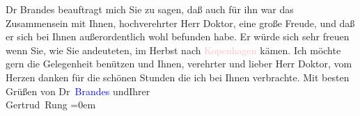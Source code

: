            \pstart
           Dr Brandes beauftragt mich Sie {\pb}zu sagen, daß auch für ihn war das Zusammensein mit Ihnen, hochverehrter Herr
                    Doktor, eine große Freude, und daß er sich bei Ihnen außerordentlich wohl
                    befunden habe. Er würde sich sehr freuen wenn Sie, wie Sie andeuteten, im Herbst
                    nach \textcolor{pink}{Kopenhagen}{}\ledrightnote{\textcolor{pink}{Kopenhagen}} kämen.\pend
           \pstart
           Ich möchte gern die Gelegenheit benützen und Ihnen, verehrter und lieber Herr
                    Doktor, vom Herzen danken für die schönen Stunden die ich bei Ihnen
                    verbrachte.\pend
           \pstart
           Mit besten Grüßen von Dr \textcolor{blue}{Brandes}{}\ledrightnote{\textcolor{blue}{Georg Brandes}}
                        und\hspace*{2.5em}Ihrer{\\[\baselineskip]}\spacefill\mbox{Gertrud Rung}\pend
           \leftskip=0em{}\endnumbering{}  
      